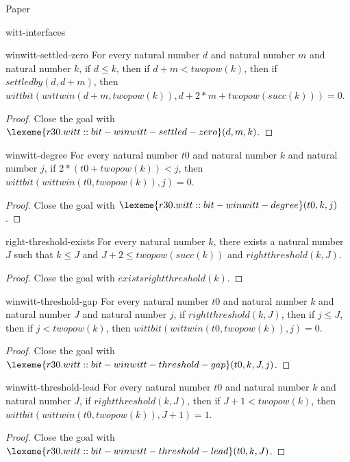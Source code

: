\begin{lexlean}{Paper}
\begin{section}{witt-interfaces}
  \begin{theorem}{winwitt-settled-zero}
  For every natural number \(d\) and natural number \(m\) and natural number \(k\), if \(d ≤ k\), then if \(d + m < twopow(k)\), then if \(settledby(d, d + m)\), then \(wittbit(wittwin(d + m, twopow(k)), d + 2 * m + twopow(succ(k))) = 0\).
  \begin{proof}
  Close the goal with \(\lexeme{r30.witt::bit-winwitt-settled-zero}(d, m, k)\).
  \end{proof}
  \end{theorem}

  \begin{theorem}{winwitt-degree}
  For every natural number \(t0\) and natural number \(k\) and natural number \(j\), if \(2 * (t0 + twopow(k)) < j\), then \(wittbit(wittwin(t0, twopow(k)), j) = 0\).
  \begin{proof}
  Close the goal with \(\lexeme{r30.witt::bit-winwitt-degree}(t0, k, j)\).
  \end{proof}
  \end{theorem}

  \begin{theorem}{right-threshold-exists}
  For every natural number \(k\), there exists a natural number \(J\) such that \(k ≤ J\) and \(J + 2 ≤ twopow(succ(k))\) and \(rightthreshold(k, J)\).
  \begin{proof}
  Close the goal with \(existsrightthreshold(k)\).
  \end{proof}
  \end{theorem}

  \begin{theorem}{winwitt-threshold-gap}
  For every natural number \(t0\) and natural number \(k\) and natural number \(J\) and natural number \(j\), if \(rightthreshold(k, J)\), then if \(j ≤ J\), then if \(j < twopow(k)\), then \(wittbit(wittwin(t0, twopow(k)), j) = 0\).
  \begin{proof}
  Close the goal with \(\lexeme{r30.witt::bit-winwitt-threshold-gap}(t0, k, J, j)\).
  \end{proof}
  \end{theorem}

  \begin{theorem}{winwitt-threshold-lead}
  For every natural number \(t0\) and natural number \(k\) and natural number \(J\), if \(rightthreshold(k, J)\), then if \(J + 1 < twopow(k)\), then \(wittbit(wittwin(t0, twopow(k)), J + 1) = 1\).
  \begin{proof}
  Close the goal with \(\lexeme{r30.witt::bit-winwitt-threshold-lead}(t0, k, J)\).
  \end{proof}
  \end{theorem}


\end{section}
\end{lexlean}
